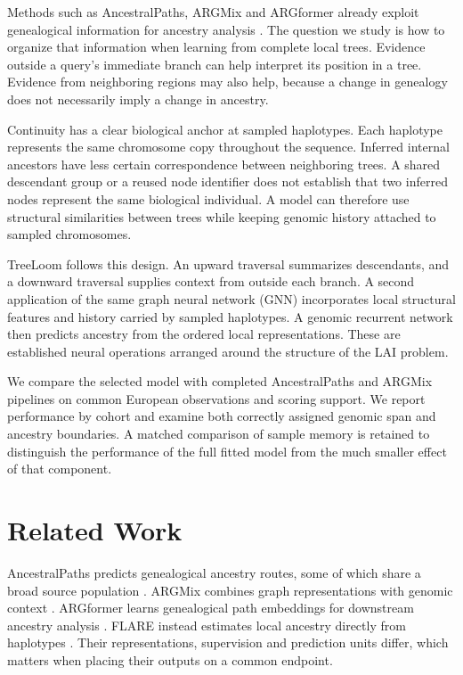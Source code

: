 \documentclass[letterpaper]{article}
\begin{document}
Methods such as AncestralPaths, ARGMix and ARGformer already exploit genealogical information for ancestry analysis \citep{eurasians2024,ancientancestry2026,argformer2026}. The question we study is how to organize that information when learning from complete local trees. Evidence outside a query's immediate branch can help interpret its position in a tree. Evidence from neighboring regions may also help, because a change in genealogy does not necessarily imply a change in ancestry.

Continuity has a clear biological anchor at sampled haplotypes. Each haplotype represents the same chromosome copy throughout the sequence. Inferred internal ancestors have less certain correspondence between neighboring trees. A shared descendant group or a reused node identifier does not establish that two inferred nodes represent the same biological individual. A model can therefore use structural similarities between trees while keeping genomic history attached to sampled chromosomes.

TreeLoom follows this design. An upward traversal summarizes descendants, and a downward traversal supplies context from outside each branch. A second application of the same graph neural network (GNN) incorporates local structural features and history carried by sampled haplotypes. A genomic recurrent network then predicts ancestry from the ordered local representations. These are established neural operations arranged around the structure of the LAI problem.

We compare the selected model with completed AncestralPaths and ARGMix pipelines on common European observations and scoring support. We report performance by cohort and examine both correctly assigned genomic span and ancestry boundaries. A matched comparison of sample memory is retained to distinguish the performance of the full fitted model from the much smaller effect of that component.

\section{Related Work}
AncestralPaths predicts genealogical ancestry routes, some of which share a broad source population \citep{eurasians2024}. ARGMix combines graph representations with genomic context \citep{ancientancestry2026}. ARGformer learns genealogical path embeddings for downstream ancestry analysis \citep{argformer2026}. FLARE instead estimates local ancestry directly from haplotypes \citep{flare2023}. Their representations, supervision and prediction units differ, which matters when placing their outputs on a common endpoint.
\end{document}
